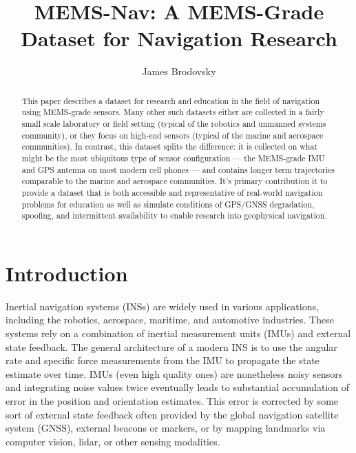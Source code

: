 \documentclass[sageh,times]{sagej}
\begin{document}

\title{MEMS-Nav: A MEMS-Grade Dataset for Navigation Research}
\author{James Brodovsky}

\begin{abstract}
This paper describes a dataset for research and education in the field of navigation using MEMS-grade sensors. Many other such datasets either are collected in a fairly small scale laboratory or field setting (typical of the robotics and unmanned systems community), or they focus on high-end sensors (typical of the marine and aerospace communities). In contrast, this dataset splits the difference: it is collected on what might be the most ubiquitous type of sensor configuration --- the MEMS-grade IMU and GPS antenna on most modern cell phones --- and contains longer term trajectories comparable to the marine and aerospace communities. It's primary contribution it to provide a dataset that is both accessible and representative of real-world navigation problems for education as well as simulate conditions of GPS/GNSS degradation, spoofing, and intermittent availability to enable research into geophysical navigation.
\end{abstract}

\maketitle
\section{Introduction}
Inertial navigation systems (INSs) are widely used in various applications, including the robotics, aerospace, maritime, and automotive industries. These systems rely on a combination of inertial measurement units (IMUs) and external state feedback. The general architecture of a modern INS is to use the angular rate and specific force measurements from the IMU to propagate the state estimate over time. IMUs (even high quality ones) are nonetheless noisy sensors and integrating noise values twice eventually leads to substantial accumulation of error in the position and orientation estimates. This error is corrected by some sort of external state feedback often provided by the global navigation satellite system (GNSS), external beacons or markers, or by mapping landmarks via computer vision, lidar, or other sensing modalities. 
\end{document}
